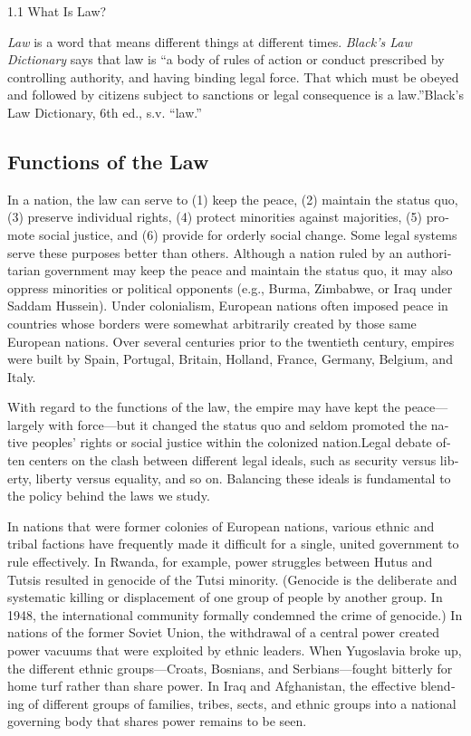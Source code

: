 \hypertarget{book-content}{}
\begin{english}

\hypertarget{mayer_1.0-ch01_s01}{}
{1.1} What Is Law?

\emph{Law} is a word that means different things at different times.
\emph{Black's Law Dictionary} says that law is ``a body of rules of
action or conduct prescribed by controlling authority, and having
binding legal force. That which must be obeyed and followed by citizens
subject to sanctions or legal consequence is a law.''{Black's Law
Dictionary, 6th ed., s.v. ``law.''}

\hypertarget{mayer_1.0-ch01_s01_s01}{}
\subsection{Functions of the Law}\label{functions-of-the-law}

In a nation, the law can serve to (1) keep the peace, (2) maintain the
status quo, (3) preserve individual rights, (4) protect minorities
against majorities, (5) promote social justice, and (6) provide for
orderly social change. Some legal systems serve these purposes better
than others. Although a nation ruled by an authoritarian government may
keep the peace and maintain the status quo, it may also oppress
minorities or political opponents (e.g., Burma, Zimbabwe, or Iraq under
Saddam Hussein). Under colonialism, European nations often imposed peace
in countries whose borders were somewhat arbitrarily created by those
same European nations. Over several centuries prior to the twentieth
century, empires were built by Spain, Portugal, Britain, Holland,
France, Germany, Belgium, and Italy.

With regard to the functions of the law, the empire may have kept the
peace---largely with force---but it changed the status quo and seldom
promoted the native peoples' rights or social justice within the
colonized nation.{Legal debate often centers on the clash between
different legal ideals, such as security versus liberty, liberty versus
equality, and so on. Balancing these ideals is fundamental to the policy
behind the laws we study.}

In nations that were former colonies of European nations, various ethnic
and tribal factions have frequently made it difficult for a single,
united government to rule effectively. In Rwanda, for example, power
struggles between Hutus and Tutsis resulted in genocide of the Tutsi
minority. (Genocide is the deliberate and systematic killing or
displacement of one group of people by another group. In 1948, the
international community formally condemned the crime of genocide.) In
nations of the former Soviet Union, the withdrawal of a central power
created power vacuums that were exploited by ethnic leaders. When
Yugoslavia broke up, the different ethnic groups---Croats, Bosnians, and
Serbians---fought bitterly for home turf rather than share power. In
Iraq and Afghanistan, the effective blending of different groups of
families, tribes, sects, and ethnic groups into a national governing
body that shares power remains to be seen.


\end{english}
